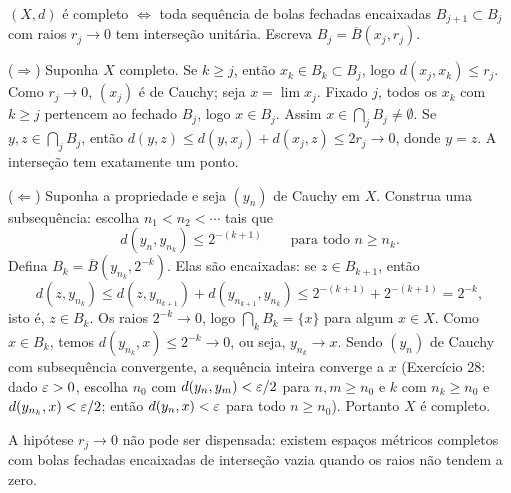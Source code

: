 \begin{exercicio}{$(X,d)$ é completo $\iff$ toda sequência de bolas fechadas encaixadas $B_{j+1}\subset B_j$ com raios $r_j\to0$ tem interseção unitária.}
\sol
Escreva $B_j=\overline{B}(x_j,r_j)$.

($\Rightarrow$) Suponha $X$ completo. Se $k\ge j$, então $x_k\in B_k\subset B_j$, logo $d(x_j,x_k)\le r_j$. Como $r_j\to0$, $(x_j)$ é de Cauchy; seja $x=\lim x_j$. Fixado $j$, todos os $x_k$ com $k\ge j$ pertencem ao fechado $B_j$, logo $x\in B_j$. Assim $x\in\bigcap_j B_j\neq\emptyset$. Se $y,z\in\bigcap_jB_j$, então $d(y,z)\le d(y,x_j)+d(x_j,z)\le 2r_j\to0$, donde $y=z$. A interseção tem exatamente um ponto.

($\Leftarrow$) Suponha a propriedade e seja $(y_n)$ de Cauchy em $X$. Construa uma subsequência: escolha $n_1<n_2<\cdots$ tais que
\[ d(y_n,y_{n_k})\le 2^{-(k+1)} \qquad \text{para todo } n\ge n_k. \]
Defina $B_k=\overline{B}(y_{n_k},2^{-k})$. Elas são encaixadas: se $z\in B_{k+1}$, então
\[ d(z,y_{n_k})\le d(z,y_{n_{k+1}})+d(y_{n_{k+1}},y_{n_k})\le 2^{-(k+1)}+2^{-(k+1)}=2^{-k}, \]
isto é, $z\in B_k$. Os raios $2^{-k}\to0$, logo $\bigcap_kB_k=\{x\}$ para algum $x\in X$. Como $x\in B_k$, temos $d(y_{n_k},x)\le2^{-k}\to0$, ou seja, $y_{n_k}\to x$. Sendo $(y_n)$ de Cauchy com subsequência convergente, a sequência inteira converge a $x$ (Exercício 28: dado $\varepsilon>0$, escolha $n_0$ com $d(y_n,y_m)<\varepsilon/2$ para $n,m\ge n_0$ e $k$ com $n_k\ge n_0$ e $d(y_{n_k},x)<\varepsilon/2$; então $d(y_n,x)<\varepsilon$ para todo $n\ge n_0$). Portanto $X$ é completo.

\begin{obs}
A hipótese $r_j\to0$ não pode ser dispensada: existem espaços métricos completos com bolas fechadas encaixadas de interseção vazia quando os raios não tendem a zero.
\end{obs}
\end{exercicio}

